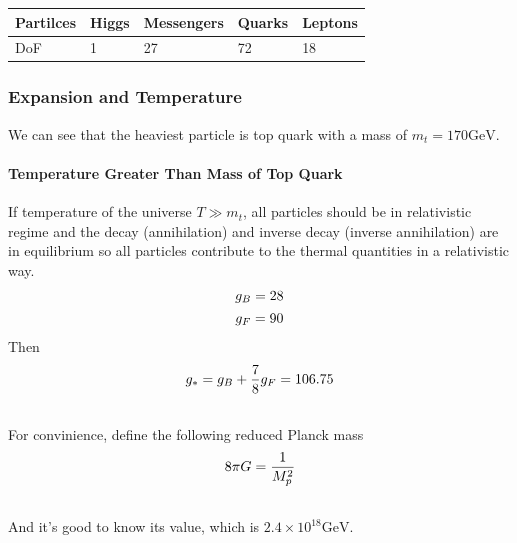 \documentclass[letterpaper,10pt,english]{sphinxmanual}
\begin{document}
{\begin{tabulary}{\linewidth}{|L|L|L|L|L|}
\hline
\textsf{\relax 
Partilces
} & \textsf{\relax 
Higgs
} & \textsf{\relax 
Messengers
} & \textsf{\relax 
Quarks
} & \textsf{\relax 
Leptons
}\\
\hline
DoF
 & 
1
 & 
27
 & 
72
 & 
18
\\
\hline\end{tabulary}



\subsubsection{Expansion and Temperature}
\label{Cosmology/cosmoIndex:expansion-and-temperature}
We can see that the heaviest particle is top quark with a mass of $m_t = 170 \mathrm{GeV}$.


\paragraph{Temperature Greater Than Mass of Top Quark}
\label{Cosmology/cosmoIndex:temperature-greater-than-mass-of-top-quark}
If temperature of the universe $T \gg m_t$, all particles should be in relativistic regime and the decay (annihilation) and inverse decay (inverse annihilation) are in equilibrium so all particles contribute to the thermal quantities in a relativistic way.
\begin{gather}
\begin{split}g_B = 28\end{split}\notag\\\begin{split}g_F = 90\end{split}\notag
\end{gather}
Then
\begin{gather}
\begin{split}g _ * = g_B + \frac{7}{8} g _ F = 106.75\end{split}\notag\\\begin{split}\end{split}\notag
\end{gather}
For convinience, define the following reduced Planck mass
\begin{gather}
\begin{split}8\pi G = \frac{1}{M _ p ^2}\end{split}\notag\\\begin{split}\end{split}\notag
\end{gather}
And it's good to know its value, which is $2.4\times 10^{18} \mathrm{GeV}$.

}
\end{document}
